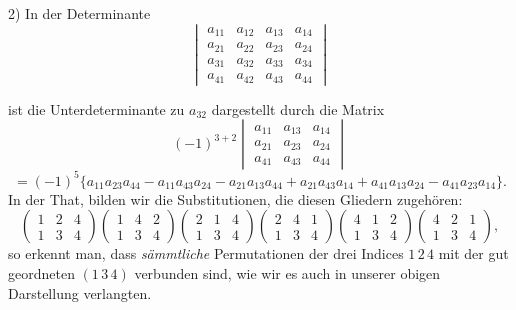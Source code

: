 \documentclass[11pt]{article}
\providecommand{\weberpage}[1]{}
\begin{document}
2) In der Determinante
\[
\begin{vmatrix}
a_{11} & a_{12} & a_{13} & a_{14} \\
a_{21} & a_{22} & a_{23} & a_{24} \\
a_{31} & a_{32} & a_{33} & a_{34} \\
a_{41} & a_{42} & a_{43} & a_{44}
\end{vmatrix}
\]


\weberpage{34}
ist die Unterdeterminante zu $a_{32}$ dargestellt durch die Matrix
\[
(-1)^{3+2}\begin{vmatrix} a_{11} & a_{13} & a_{14} \\ a_{21} & a_{23} & a_{24} \\ a_{41} & a_{43} & a_{44} \end{vmatrix}
\]
\[
=(-1)^5\{a_{11}a_{23}a_{44}-a_{11}a_{43}a_{24}-a_{21}a_{13}a_{44}+a_{21}a_{43}a_{14}+a_{41}a_{13}a_{24}-a_{41}a_{23}a_{14}\}.
\]
In der That, bilden wir die Substitutionen, die diesen Gliedern zugehören:
\[
\begin{pmatrix} 1 & 2 & 4 \\ 1 & 3 & 4 \end{pmatrix}
\begin{pmatrix} 1 & 4 & 2 \\ 1 & 3 & 4 \end{pmatrix}
\begin{pmatrix} 2 & 1 & 4 \\ 1 & 3 & 4 \end{pmatrix}
\begin{pmatrix} 2 & 4 & 1 \\ 1 & 3 & 4 \end{pmatrix}
\begin{pmatrix} 4 & 1 & 2 \\ 1 & 3 & 4 \end{pmatrix}
\begin{pmatrix} 4 & 2 & 1 \\ 1 & 3 & 4 \end{pmatrix},
\]
so erkennt man, dass \textit{sämmtliche} Permutationen der drei Indices
$1\,2\,4$ mit der gut geordneten $(1\,3\,4)$ verbunden sind, wie wir es auch
in unserer obigen Darstellung verlangten.
\end{document}

